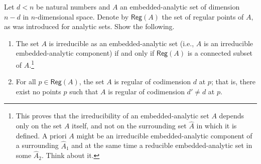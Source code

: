 \documentclass[a4paper]{amsart}
\newcommand{\Reg}[1]{\mathsf{Reg}(#1)}
\theoremstyle{remark}
\numberwithin{equation}{question}
\begin{document}
\begin{question}[name=Exercise*, subtitle=Characterizing irreducibility for embedded-analytic sets]
\label{qu:irreducibility}
Let $d<n$ be natural numbers and $A$ an embedded-analytic set of dimension $n-d$ in $n$-dimensional space. Denote by $\Reg A$ the set of regular points of $A$, as was introduced for analytic sets. Show the following.
\begin{enumerate}
\item The set $A$ is irreducible as an embedded-analytic set (i.e., $A$ is an irreducible embedded-analytic component) if and only if $\Reg A$ is a connected subset of $A$.\footnote{This proves that the irreducibility of an embedded-analytic set $A$ depends only on the set $A$ itself, and not on the surrounding set $\hat A$ in which it is defined. A priori $A$ might be an irreducible embedded-analytic component of a surrounding $\hat A_1$ and at the same time a reducible embedded-analytic set in some $\hat A_2$. Think about it.}
\item\label{it:irreducibility-b} For all $p \in \Reg A$, the set $A$ is regular of codimension $d$ at $p$; that is, there exist no points $p$ such that $A$ is regular of codimension $d' \ne d$ at $p$.
\end{enumerate}
\end{question}
\end{document}
